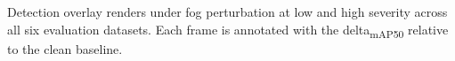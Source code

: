 \caption{Detection overlay renders under fog perturbation at low and high severity across all six evaluation datasets. Each frame is annotated with the delta\textsubscript{mAP50} relative to the clean baseline.}\label{fig:perturbation-plate-fog}

